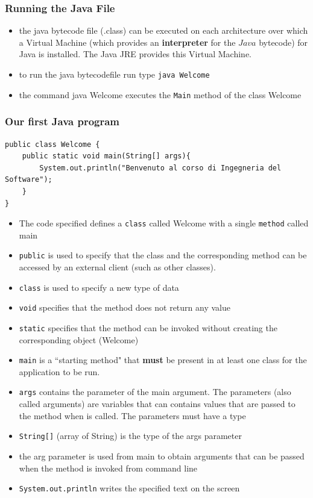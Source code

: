 \documentclass{article}
\theoremstyle{definition}
\begin{document}
\subsubsection{Running the Java File}
\begin{itemize}
\item the java bytecode file (.class) can be executed on each architecture over which a Virtual Machine (which provides an \textbf{interpreter} for the $Java$ bytecode) for Java is installed. The Java JRE provides this Virtual Machine.
\item to run the java bytecodefile run type \texttt{java Welcome}
\item the command java Welcome executes the \texttt{Main} method of the class Welcome
\end{itemize}

\subsubsection{Our first Java program}
\begin{lstlisting}
public class Welcome {	
    public static void main(String[] args){	
	 	System.out.println("Benvenuto al corso di Ingegneria del Software");
    }
}
\end{lstlisting}
\begin{itemize}
\item The code specified defines a \texttt{class} called Welcome with a single \texttt{method} called main
\item \texttt{public} is used to specify that the class and the corresponding method can be accessed by an external client (such as other classes).
\item \texttt{class} is used to specify a new type of data
\item \texttt{void} specifies that the method does not return any value
\item \texttt{static} specifies that the method can be invoked without creating the corresponding object (Welcome)
\item \texttt{main} is a ``starting method" that \textbf{must} be present in at least one class for the application to be run.
\item \texttt{args} contains the parameter of the main argument. The parameters (also called arguments) are variables that can contains values that are passed to the method when is called. The parameters must have a type
\item \texttt{String[]} (array of String) is the type of the args parameter 
\item the arg parameter is used from main to obtain arguments that can be passed when the method is invoked from command line
\item \texttt{System.out.println} writes the specified text on the screen
\end{itemize}
\end{document}
